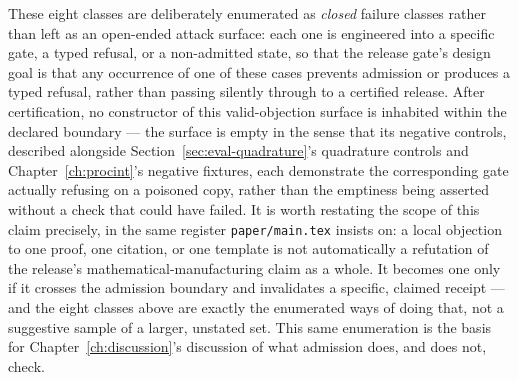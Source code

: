 These eight classes are deliberately enumerated as \emph{closed} failure
classes rather than left as an open-ended attack surface: each one is
engineered into a specific gate, a typed refusal, or a non-admitted
state, so that the release gate's design goal is that any occurrence of
one of these cases prevents admission or produces a typed refusal, rather
than passing silently through to a certified release. After certification,
no constructor of this valid-objection surface is inhabited within the
declared boundary --- the surface is empty in the sense that its
negative controls, described alongside Section~\ref{sec:eval-quadrature}'s
quadrature controls and Chapter~\ref{ch:procint}'s negative fixtures,
each demonstrate the corresponding gate actually refusing on a poisoned
copy, rather than the emptiness being asserted without a check that could
have failed. It is worth restating the scope of this claim precisely, in
the same register \texttt{paper/main.tex} insists on: a local objection
to one proof, one citation, or one template is not automatically a
refutation of the release's mathematical-manufacturing claim as a whole.
It becomes one only if it crosses the admission boundary and invalidates
a specific, claimed receipt --- and the eight classes above are exactly
the enumerated ways of doing that, not a suggestive sample of a larger,
unstated set. This same enumeration is the basis for
Chapter~\ref{ch:discussion}'s discussion of what admission does, and does
not, check.
